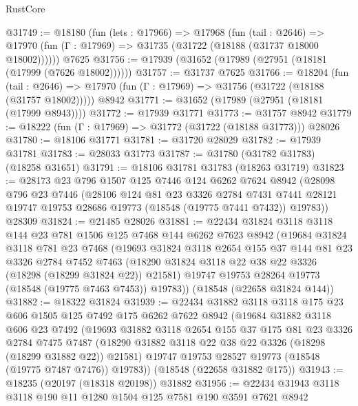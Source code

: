 \begin{lexlean}{RustCore}
\begin{coremodule}
@31749 := @18180
    (fun (lets : @17966) =>
    @17968
      (fun (tail : @2646) =>
      @17970 (fun (Γ : @17969) => @31735 (@31722 (@18188 (@31737 @18000 @18002))))))
    @7625
@31756 := @17939 (@31652 (@17989 (@27951 (@18181 (@17999 (@7626 @18002))))))
@31757 := @31737 @7625
@31766 := @18204
    (fun (tail : @2646) => @17970 (fun (Γ : @17969) => @31756 (@31722 (@18188 (@31757 @18002)))))
    @8942
@31771 := @31652 (@17989 (@27951 (@18181 (@17999 @8943))))
@31772 := @17939 @31771
@31773 := @31757 @8942
@31779 := @18222 (fun (Γ : @17969) => @31772 (@31722 (@18188 @31773))) @28026
@31780 := @18106 @31771
@31781 := @31720 @28029
@31782 := @17939 @31781
@31783 := @28033 @31773
@31787 := @31780 (@31782 @31783) (@18258 @31651)
@31791 := @18106 @31781 @31783 (@18263 @31719)
@31823 := @28173
    @23
    @796
    @1507
    @125
    @7446
    @124
    @6262
    @7624
    @8942
    (@28098
      @796
      @23
      @7446
      (@28106
        @124
        @81
        @23
        @3326
        @2784
        @7431
        @7441
        @28121
        @19747
        @19753
        @28686
        @19773
        (@18548 (@19775 @7441 @7432))
        @19783))
    @28309
@31824 := @21485 @28026
@31881 := @22434
    @31824
    @3118
    @3118
    @144
    @23
    @781
    @1506
    @125
    @7468
    @144
    @6262
    @7623
    @8942
    (@19684
      @31824
      @3118
      @781
      @23
      @7468
      (@19693
        @31824
        @3118
        @2654
        @155
        @37
        @144
        @81
        @23
        @3326
        @2784
        @7452
        @7463
        (@18290 @31824 @3118 @22 @38 @22 @3326 (@18298 (@18299 @31824 @22)) @21581)
        @19747
        @19753
        @28264
        @19773
        (@18548 (@19775 @7463 @7453))
        @19783))
    (@18548 (@22658 @31824 @144))
@31882 := @18322 @31824
@31939 := @22434
    @31882
    @3118
    @3118
    @175
    @23
    @606
    @1505
    @125
    @7492
    @175
    @6262
    @7622
    @8942
    (@19684
      @31882
      @3118
      @606
      @23
      @7492
      (@19693
        @31882
        @3118
        @2654
        @155
        @37
        @175
        @81
        @23
        @3326
        @2784
        @7475
        @7487
        (@18290 @31882 @3118 @22 @38 @22 @3326 (@18298 (@18299 @31882 @22)) @21581)
        @19747
        @19753
        @28527
        @19773
        (@18548 (@19775 @7487 @7476))
        @19783))
    (@18548 (@22658 @31882 @175))
@31943 := @18235 (@20197 (@18318 @20198)) @31882
@31956 := @22434 @31943 @3118 @3118 @190 @11 @1280 @1504 @125 @7581 @190 @3591 @7621 @8942

\end{coremodule}
\end{lexlean}
